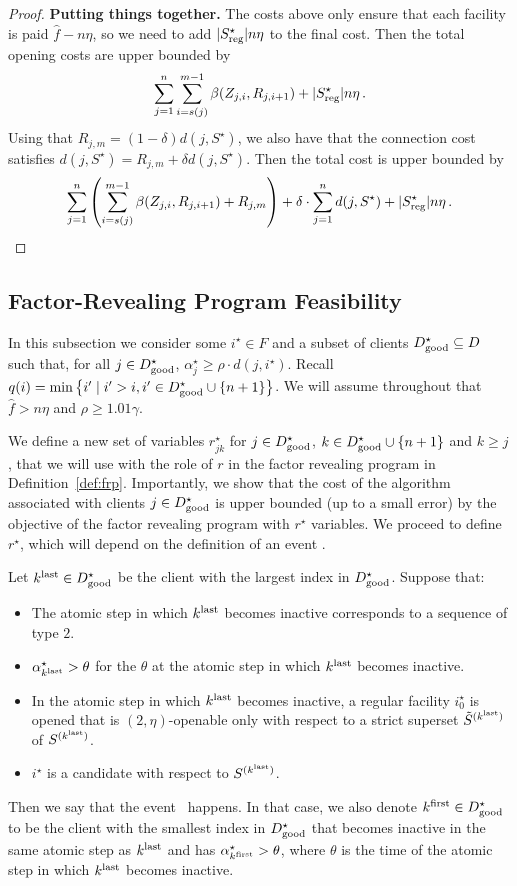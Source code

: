 \begin{proof}
    \textbf{Putting things together.}
    The costs above only ensure that each facility is paid $\hat{f} - n \eta$, so we need to add $|S_{\mathrm{reg}}^\star| n \eta$ to the final cost.
    Then the total opening costs are upper bounded by
    \[\sum_{j=1}^n \sum_{i=s(j)}^{m-1} \beta(Z_{j,i}, R_{j, i+1}) + |S_{\mathrm{reg}}^\star|n\eta\,.\]
    Using that $R_{j,m} = (1-\delta)d(j, S^\star)$, we also have that the connection cost satisfies $d(j, S^\star) = R_{j,m} + \delta d(j, S^\star)$.
    Then the total cost is upper bounded by
    \[\sum_{j=1}^n \left(\sum_{i=s(j)}^{m-1} \beta(Z_{j,i}, R_{j,i+1}) + R_{j, m}\right) + \delta \cdot \sum_{j=1}^n d(j,S^\star) + |S_{\mathrm{reg}}^\star| n \eta\,.\]
\end{proof}

\subsection{Factor-Revealing Program Feasibility}
\label{sec:fr-feasiblity-robust}

In this subsection we consider some $i^\star \in F$ and a subset of clients $D^\star_{\mathrm{good}} \subseteq D$ such that, for all $j \in D^\star_{\mathrm{good}}$, $\alpha_j^\star \geq \rho \cdot d(j, i^\star)$.
Recall $q(i) = \min \left\{i' \mid i' > i, i' \in D^\star_{\mathrm{good}} \cup \{n+1\}\right\}$.
We will assume throughout that $\hat{f} > n \eta$ and $\rho \geq 1.01 \gamma$.

We define a new set of variables $r^\star_{jk}$ for $j \in D^\star_{\mathrm{good}}$, $k \in D^\star_{\mathrm{good}} \cup \{n + 1\}$ and $k \geq j$, that we will use with the role of $r$ in the factor revealing program in Definition~\ref{def:frp}.
Importantly, we show that the cost of the algorithm associated with clients $j \in D^\star_{\mathrm{good}}$ is upper bounded (up to a small error) by the objective of the factor revealing program with $r^\star$ variables.
We proceed to define $r^\star$, which will depend on the definition of an event \specialevent.

\begin{definition}
Let $k^{\mathrm{last}} \in D^\star_{\mathrm{good}}$ be the client with the largest index in $D^\star_{\mathrm{good}}$. Suppose that:
\begin{itemize}
    \item The atomic step in which $k^{\mathrm{last}}$ becomes inactive corresponds to a sequence of type $2$.
    \item $\alpha^\star_{k^{\mathrm{last}}} > \theta$ for the $\theta$ at the atomic step in which $k^{\mathrm{last}}$ becomes inactive.
    \item In the atomic step in which $k^{\mathrm{last}}$ becomes inactive, a regular facility $i_0^\star$ is opened that is $(2,\eta)$-openable only with respect to a strict superset $\tilde{S}^{(k^{\mathrm{last}})}$ of $S^{(k^{\mathrm{last}})}$.
    \item $i^\star$ is a candidate with respect to $S^{(k^{\mathrm{last}})}$.
\end{itemize}
Then we say that the event \specialevent\ happens.
In that case, we also denote $k^{\mathrm{first}} \in D^\star_{\mathrm{good}}$ to be the client with the smallest index in $D^\star_{\mathrm{good}}$ that becomes inactive in the same atomic step as $k^{\mathrm{last}}$ and has $\alpha^\star_{k^{\mathrm{first}}} > \theta$, where $\theta$ is the time of the atomic step in which $k^{\mathrm{last}}$ becomes inactive.
\end{definition}

